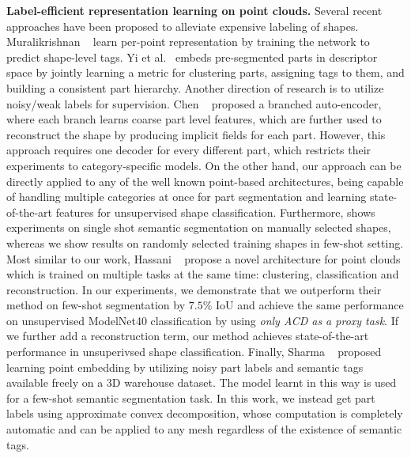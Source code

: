 \noindent\textbf{Label-efficient representation learning on point clouds.}
Several recent approaches \cite{Muralikrishnan18,cosegnetChenyang,hassani2019unsupervised,chen2019bae,SharmaPEN} have been proposed to
alleviate expensive labeling of shapes. Muralikrishnan \etal~\cite{Muralikrishnan18} learn per-point representation by training the
network to predict shape-level tags. Yi et al.~\cite{Yi:2017:LHS}
embeds pre-segmented parts in descriptor space by jointly learning a
metric for clustering parts, assigning tags to them, and building a
consistent part hierarchy. Another direction of research is to
utilize noisy/weak labels for supervision.
Chen \etal~\cite{chen2019bae} proposed a branched auto-encoder, where each branch
learns coarse part level features, which are further used to
reconstruct the shape by producing implicit fields for each part.
However, this approach requires one decoder for every different part, which
restricts their experiments to category-specific models.
On the other hand, our approach can be directly applied to any of the well known
point-based architectures, being capable of handling multiple categories at once
for part segmentation and learning state-of-the-art features for unsupervised shape classification.
Furthermore, \cite{chen2019bae} shows experiments on single shot semantic segmentation on manually
selected shapes, whereas we show results on randomly selected training
shapes in few-shot setting.
Most similar to our work, Hassani \etal~\cite{hassani2019unsupervised} propose a novel architecture for
point clouds which is trained on multiple tasks at the same time: clustering, classification and reconstruction.
In our experiments, we demonstrate that we outperform their method on few-shot segmentation by $\mathbf{7.5\%}$ IoU and
achieve the same performance on unsupervised ModelNet40 classification by using \emph{only ACD as a proxy task}.
If we further add a reconstruction term, our method achieves state-of-the-art performance in unsuperivsed shape classification.
Finally, Sharma \etal~\cite{SharmaPEN} proposed learning point embedding by utilizing noisy
part labels and semantic tags available freely on a 3D warehouse
dataset. The model learnt in this way is used for a few-shot semantic
segmentation task. 
In this work, we instead get part labels using approximate convex decomposition, whose computation is completely
automatic and can be applied to any mesh regardless of the existence of semantic tags.